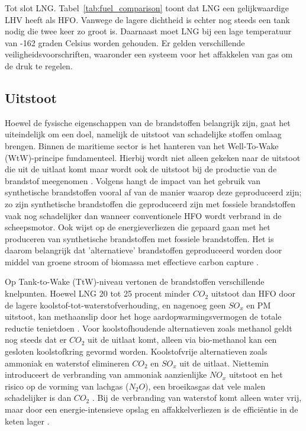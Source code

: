 \documentclass[a4paper]{IMDC2024}
\begin{document}
Tot slot LNG. Tabel~\ref{tab:fuel_comparison} toont dat LNG een gelijkwaardige LHV heeft als HFO. Vanwege de lagere dichtheid is echter nog steeds een tank nodig die twee keer zo groot is. Daarnaast moet LNG bij een lage temperatuur van -162 graden Celsius worden gehouden. Er gelden verschillende veiligheidsvoorschriften, waaronder een systeem voor het affakkelen van gas om de druk te regelen.

\subsection{Uitstoot}
Hoewel de fysische eigenschappen van de brandstoffen belangrijk zijn, gaat het uiteindelijk om een doel, namelijk de uitstoot van schadelijke stoffen omlaag brengen. Binnen de maritieme sector is het hanteren van het Well-To-Wake (WtW)-principe fundamenteel. Hierbij wordt niet alleen gekeken naar de uitstoot die uit de uitlaat komt maar wordt ook de uitstoot bij de productie van de brandstof meegenomen \citep{vidovic2023}. Volgens \citet{tadros2023} hangt de impact van het gebruik van synthetische brandstoffen vooral af van de manier waarop deze geproduceerd zijn; zo zijn synthetische brandstoffen die geproduceerd zijn met fossiele brandstoffen vaak nog schadelijker dan wanneer conventionele HFO wordt verbrand in de scheepsmotor. Ook \citet{vidovic2023} wijst op de energieverliezen die gepaard gaan met het produceren van synthetische brandstoffen met fossiele brandstoffen. Het is daarom belangrijk dat 'alternatieve' brandstoffen geproduceerd worden door middel van groene stroom of biomassa met effectieve carbon capture \citep{tadros2023}. 

Op Tank-to-Wake (TtW)-niveau vertonen de brandstoffen verschillende knelpunten. Hoewel LNG 20 tot 25 procent minder $CO_2$ uitstoot dan HFO door de lagere koolstof-tot-waterstofverhouding, en nagenoeg geen $SO_x$ en PM uitstoot, kan methaanslip door het hoge aardopwarmingsvermogen de totale reductie tenietdoen \citep{tadros2023, charvalos2025}. Voor koolstofhoudende alternatieven zoals methanol geldt nog steeds dat er $CO_2$ uit de uitlaat komt, alleen via bio-methanol kan een gesloten koolstofkring gevormd worden. Koolstofvrije alternatieven zoals ammoniak en waterstof elimineren $CO_2$ en $SO_x$ uit de uitlaat. Niettemin introduceert de verbranding van ammoniak aanzienlijke $NO_x$ uitstoot en het risico op de vorming van lachgas ($N_2O$), een broeikasgas dat vele malen schadelijker is dan $CO_2$ \citep{dimicco2024}. Bij de verbranding van waterstof komt alleen water vrij, maar door een energie-intensieve opslag en affakkelverliezen is de efficiëntie in de keten lager \citep{vanhoecke2021challenges}. 
\end{document}
